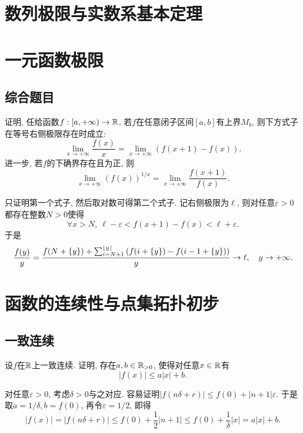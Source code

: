 \chapter{数列极限与实数系基本定理}






\chapter{一元函数极限}

\section{综合题目}

\begin{exercise} \label{ex:于品p127_A9}
	证明, 任给函数$f:[a,+\infty ) \to \mathbb{R}$, 若$f$在任意闭子区间$[a,b]$有上界$M_b$, 则下方式子在等号右侧极限存在时成立: $$\lim_{x\to +\infty} \frac{f(x)}{x} = \lim_{x \to +\infty} (f(x+1)-f(x)).$$
	进一步, 若$f$的下确界存在且为正, 则$$\lim_{x \to +\infty} (f(x))^{1/x} = \lim_{x \to +\infty} \frac{f(x+1)}{f(x)}. $$
\end{exercise}
\begin{solution}
	只证明第一个式子, 然后取对数可得第二个式子. 记右侧极限为$\ell$, 则对任意$\varepsilon >0$都存在整数$N>0$使得$$\forall x > N,~\ell - \varepsilon < f(x+1)-f(x) < \ell + \varepsilon .$$
	于是$$\frac{f(y)}{y} = \frac{f(N + \{ y \})+\sum_{i=N+1}^{\lfloor y \rfloor}\left( f(i+\{ y \})-f(i-1 + \{ y \}) \right)}{y} \to \ell ,\quad y \to +\infty .$$
\end{solution}




\chapter{函数的连续性与点集拓扑初步}

\section{一致连续}

\begin{exercise} \label{ex:于品p128_D3}
	设$f$在$\mathbb{R}$上一致连续. 证明, 存在$a,b \in \mathbb{R} _{>0}$, 使得对任意$x \in \mathbb{R}$有$$|f(x)| \leq a|x|+b.$$
\end{exercise}
\begin{solution}
	对任意$\varepsilon >0$, 考虑$\delta >0$与之对应. 容易证明$|f(n\delta +r)| \leq f(0)+|n+1|\varepsilon$. 于是取$a=1/\delta ,b=f(0)$, 再令$\varepsilon = 1/2$, 即得$$|f(x)| = |f(n\delta +r)| \leq f(0)+\frac{1}{2}|n+1| \leq f(0)+\frac{1}{\delta}|x| = a|x|+b. $$
\end{solution}

